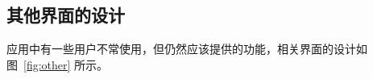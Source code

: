 
\subsection{其他界面的设计}\label{subsec:other-design}

应用中有一些用户不常使用，但仍然应该提供的功能，相关界面的设计如图~\ref{fig:other} 所示。

\begin{figure}[h]

\end{figure}
